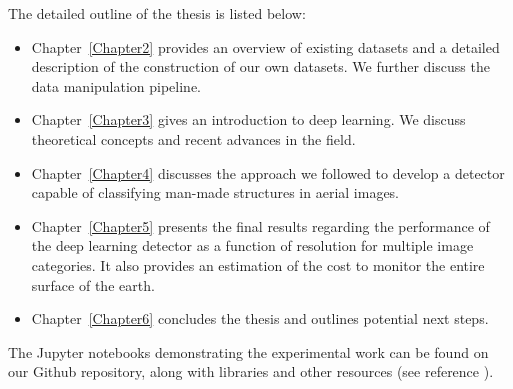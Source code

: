 The detailed outline of the thesis is listed below:
\begin{itemize}
	\item Chapter~\ref{Chapter2} provides an overview of existing datasets and a detailed description of the construction of our own datasets. We further discuss the data manipulation pipeline.
	
	\item Chapter~\ref{Chapter3} gives an introduction to deep learning. We discuss theoretical concepts and recent advances in the field.
	
	\item Chapter~\ref{Chapter4} discusses the approach we followed to develop a detector capable of classifying man-made structures in aerial images.
	
	\item Chapter~\ref{Chapter5} presents the final results regarding the performance of the deep learning detector as a function of resolution for multiple image categories. It also provides an estimation of the cost to monitor the entire surface of the earth.
	
	\item Chapter~\ref{Chapter6} concludes the thesis and outlines potential next steps.	
\end{itemize}	

The Jupyter notebooks demonstrating the experimental work can be found on our Github repository, along with libraries and other resources (see reference \parencite{github}).